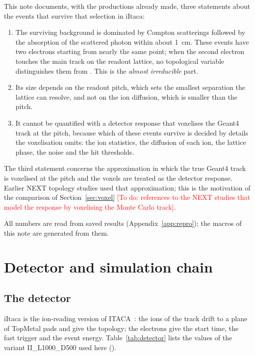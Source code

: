\documentclass[11pt,a4paper]{article}
\newcommand{\code}[1]{\path{#1}}
\newcommand{\todo}[1]{\textcolor{red}{[To do: #1]}}
\begin{document}
This note documents, with the productions already made, three statements
about the \BI events that survive that selection in iItaca:
\begin{enumerate}
\item The surviving background is dominated by Compton scatterings followed by
  the absorption of the scattered photon within about 1~cm. These events have
  two electrons starting from nearly the same point; when the second electron
  touches the main track on the readout lattice, no topological variable
  distinguishes them from \bbonu. This is the \emph{almost irreducible} part.
\item Its size depends on the readout pitch, which sets the smallest
  separation the lattice can resolve, and not on the ion diffusion, which is
  smaller than the pitch.
\item It cannot be quantified with a detector response that voxelises the
  Geant4 track at the pitch, because which of these events survive is decided
  by details the voxelisation omits: the ion statistics, the diffusion of each
  ion, the lattice phase, the noise and the hit thresholds.
\end{enumerate}
The third statement concerns the approximation in which the true Geant4 track
is voxelised at the pitch and the voxels are treated as the detector response.
Earlier NEXT topology studies used that approximation; this is the motivation
of the comparison of Section~\ref{sec:voxel}
\todo{references to the NEXT studies that model the response by voxelising
the Monte Carlo track}.

All numbers are read from saved results (Appendix~\ref{app:repro}); the
macros of this note are generated from them.

\section{Detector and simulation chain}
\label{sec:chain}

\subsection{The detector}
iItaca is the ion-reading version of ITACA~\cite{itaca2026}: the
\xetp{} ions of the track drift to a plane of TopMetal pads and give the
topology; the electrons give the start time, the fast trigger and the event
energy. Table~\ref{tab:detector} lists the values of the variant
II\_L1000\_D500 used here (\code{notes/html/iitaca_detector.html}).
\end{document}
